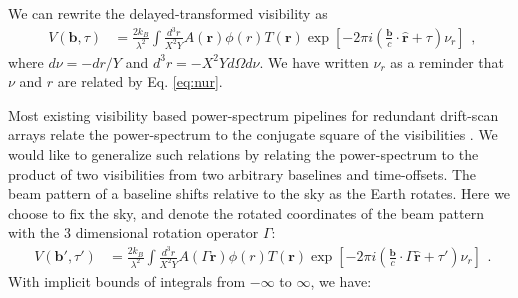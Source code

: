 \documentclass[twocolumn,apj,numberedappendix]{emulateapj}
\renewcommand\[{\begin{equation}}
\renewcommand\]{\end{equation}}
\begin{document}
We can rewrite the delayed-transformed visibility as 
\small
\[
\begin{aligned}V(\boldsymbol{b},\tau) & =\frac{2k_{B}}{\lambda^{2}}\int\frac{d^{3}r}{X^{2}Y}A(\boldsymbol{r})\phi(r)T(\boldsymbol{r})\exp\left[-2\pi i\left(\frac{\boldsymbol{b}}{c}\cdot\hat{\boldsymbol{r}}+\tau\right)\nu_{r}\right]\end{aligned},
\]
\normalsize
 where $d\nu=-dr/Y$ and $d^{3}r=-X^{2}Yd\Omega d\nu$. 
We have written $\nu_{r}$ as a reminder that $\nu$ and $r$ are related
by Eq. \eqref{eq:nur}. 

Most existing visibility based power-spectrum pipelines for redundant drift-scan  arrays relate the power-spectrum to the conjugate square of the visibilities \citep{first-paper, paper32, Ali2015}. We would like to generalize such relations by relating the power-spectrum to the product of two visibilities from two arbitrary baselines and time-offsets. 
The beam pattern of a baseline shifts relative to the sky as the Earth rotates. Here we choose to fix the sky, and denote the rotated coordinates
of the beam pattern with the 3 dimensional rotation operator $\Gamma$:
\small
\[
\begin{aligned}V(\boldsymbol{b'},\tau') & =\frac{2k_{B}}{\lambda^{2}}\int\frac{d^{3}r}{X^{2}Y}A(\Gamma\boldsymbol{r})\phi(r)T(\boldsymbol{r})\exp\left[-2\pi i\left(\frac{\boldsymbol{b}}{c}\cdot\Gamma\hat{\boldsymbol{r}}+\tau'\right)\nu_{r}\right]\end{aligned}.
\]
\normalsize
With implicit bounds of integrals from $-\infty$ to $\infty$, we have:
\end{document}

